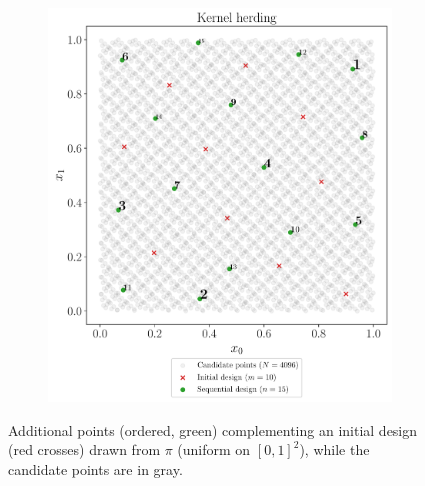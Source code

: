 \begin{figure}
\begin{subfigure}[b]{0.48\linewidth}
  \end{subfigure}
  \\
  \begin{subfigure}[b]{0.48\linewidth}
    \centering
    \includegraphics[width=\textwidth]{./part2/figures/SIS/uniform2D_KH.pdf}
  \end{subfigure}
  \caption{Additional points (ordered, green) complementing an initial design (red crosses) drawn from $\pi$ (uniform on $[0,1]^2$), while the candidate points are in gray.}
  \label{fig:uniform_validation_designs}
\end{figure}

